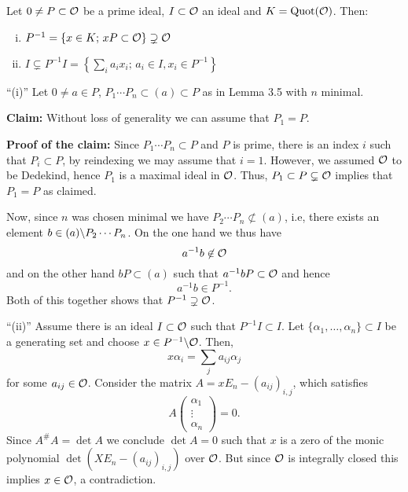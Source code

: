 \begin{Lem}
	Let $0 \neq P \subset \mathcal{O}$ be a prime ideal, $I \subset \mathcal{O}$ an ideal and $K=\operatorname{Quot}(\mathcal{O})$. Then:
	\begin{enumerate}[(i)]
		\item $P^{-1} = \{ x \in K; \, xP \subset \mathcal{O} \} \supsetneq \mathcal{O} $
		\item $ I \subsetneq P^{-1} I = \left\{  \sum_i a_ix_i; \, a_i \in I, x_i \in P^{-1}  \right\}$
	\end{enumerate}
\end{Lem}

\begin{Bew}
	\enquote{(i)} Let $0 \neq a \in P$, $P_1 \cdots P_n \subset (a) \subset P$ as in Lemma 3.5 with $n$ minimal.
	

	\bigskip
	\textbf{Claim:} Without loss of generality we can assume that $P_1 =P$.
	
	\textbf{Proof of the claim:}
	Since $P_1 \cdots P_n \subset P$ and $P$ is prime, there is an index $i$ such that $P_i \subset P$, by reindexing we may assume that $i=1$.
	However, we assumed $\mathcal{O}$ to be Dedekind, hence $P_1$ is a maximal ideal in $\mathcal{O}$. Thus,  $P_1 \subset P \subsetneq \mathcal{O}$ implies that $P_1 = P$ as claimed.
	
	\bigskip
	Now, since $n$ was chosen minimal we have $P_2 \cdots P_n \not\subset (a)$, i.e, there exists an element $b \in (a) \backslash P_2 \cdots P_n$. On the one hand we thus have
	\[ a^{-1} b \not \in \mathcal{O}
	\]
	and on the other hand $bP \subset (a)$ such that $a^{-1}bP \subset \mathcal{O}$ and hence
	\[ a^{-1} b \in P^{-1}.
	\]
	Both of this together shows that $P^{-1} \supsetneq \mathcal{O}$.
	
	\bigskip \enquote{(ii)} Assume there is an ideal $I \subset \mathcal{O}$ such that $P^{-1} I \subset I$. Let $\{\alpha_1, \dots, \alpha_n \} \subset I$ be a generating set and choose $x \in P^{-1} \backslash \mathcal{O}$. Then,
	\[ x \alpha_i = \sum_j a_{ij} \alpha_j
	\]
	for some $a_{ij} \in \mathcal{O}$. Consider the matrix $A=  xE_n - \left( a_{ij}\right)_{i,j}$, which satisfies
	\[ A \begin{pmatrix}
	\alpha_1 \\ \vdots \\ \alpha_n
	\end{pmatrix}
	= 0.
	\]
	Since $A^\#A = \det A$ we conclude $\det A =0$ such that $x$ is a zero of the monic polynomial $\det \left(  XE_n - \left( a_{ij}\right)_{i,j} \right)$ over $\mathcal{O}$. But since $\mathcal{O}$ is integrally closed this implies $x \in \mathcal{O}$, a contradiction.
\end{Bew}


